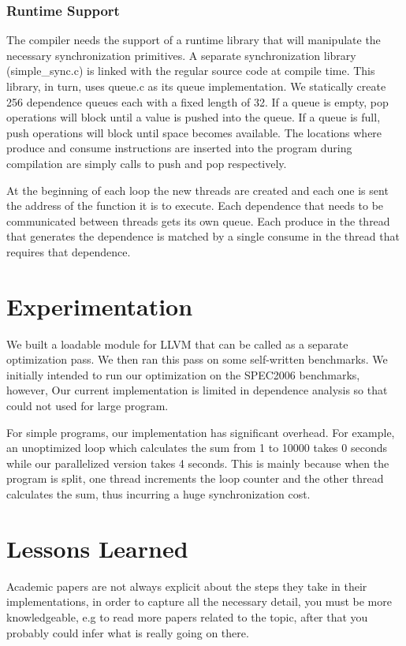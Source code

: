 \documentclass[11pt, letter]{article}
\begin{document}
\subsubsection{Runtime Support}
The compiler needs the support of a runtime library that will manipulate the necessary synchronization primitives.  A separate synchronization library (simple\_sync.c) is linked with the regular source code at compile time.  This library, in turn, uses queue.c as its queue implementation.  We statically create 256 dependence queues each with a fixed length of 32.  If a queue is empty, pop operations will block until a value is pushed into the queue.  If a queue is full, push operations will block until space becomes available.  The locations where produce and consume instructions are inserted into the program during compilation are simply calls to push and pop respectively.

At the beginning of each loop the new threads are created and each one is sent the address of the function it is to execute.  Each dependence that needs to be communicated between threads gets its own queue.  Each produce in the thread that generates the dependence is matched by a single consume in the thread that requires that dependence.

\section{Experimentation}
We built a loadable module for LLVM that can be called as a separate optimization pass.  We then ran this pass on some self-written benchmarks.  We initially intended to run our optimization on the SPEC2006 benchmarks, however, Our current implementation is limited in dependence analysis so that could not used for large program. 

For simple programs, our implementation has significant overhead.  For example, an unoptimized loop which calculates the sum from 1 to 10000 takes 0 seconds while our parallelized version takes 4 seconds. This is mainly because when the program is split, one thread increments the loop counter and the other thread calculates the sum, thus incurring a huge synchronization cost.

\section{Lessons Learned}
Academic papers are not always explicit about the steps they take in their implementations, in order to capture all the necessary detail, you must be more knowledgeable, e.g to read more papers related to the topic, after that you probably could infer what is really going on there.
\end{document}
